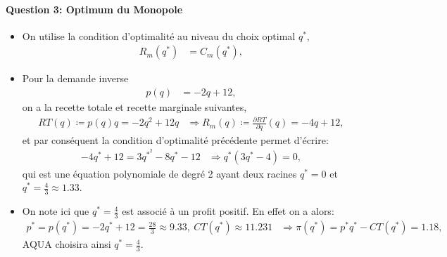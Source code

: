   \begin{frame}
 [allowframebreaks]{\insertsection}
 \framesubtitle{Question 3: Optimum du Monopole}
 \begin{itemize}
 \item On utilise la condition d'optimalité au niveau du choix optimal $q^*$,
 \begin{align*}
 R_m(q^*) &= C_m(q^*),
 \end{align*}
\item Pour la demande inverse
\begin{align*}
p(q)&= -2q + 12,
\end{align*}
on a la recette totale et recette marginale suivantes,
 \begin{align*}
 RT(q) \coloneqq p(q)q = -2q^2+12q &\Rightarrow R_m(q)\coloneqq \frac{\partial RT}{\partial q}(q) = -4q+12,
 \end{align*}
 et par conséquent la condition d'optimalité précédente permet d'écrire:
 \begin{align*}
  -4q^* + 12 = 3q^{*^2} - 8q^* - 12 &\Rightarrow q^*(3q^* - 4) = 0,
 \end{align*}
 qui est une équation polynomiale de degré 2 ayant deux racines $q^* = 0$ et $q^* = \frac{4}{3}\approx 1.33$. 
 \item On note ici que  $q^* = \frac{4}{3}$ est associé à un profit positif. En effet on a alors:
 \begin{align*}
 p^* =p(q^*) = -2q^* + 12 = \frac{28}{3}  \approx  9.33, \ CT(q^*)  \approx 11.23 1 &\Rightarrow \pi(q^*) = p^*q^* -  CT(q^*)  = 1.18,
 \end{align*}
AQUA choisira ainsi $q^* = \frac{4}{3}$.
  \end{itemize}
 \end{frame}
 
